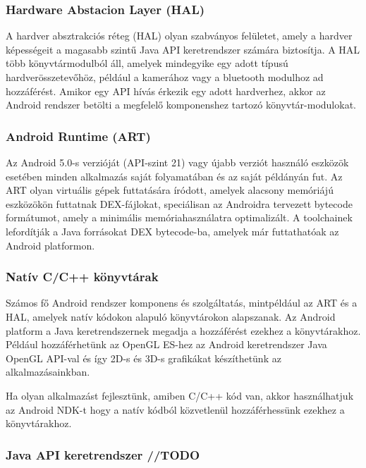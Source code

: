 \documentclass[../main.tex]{subfiles}
\begin{document}
        \subsubsection{Hardware Abstacion Layer (HAL)}
             A hardver absztrakciós réteg (HAL) olyan szabványos felületet, amely a hardver képességeit a magasabb szintű Java API keretrendszer számára biztosítja. A HAL több könyvtármodulból áll,  amelyek mindegyike egy adott típusú hardverösszetevőhöz, például a kamerához vagy a bluetooth modulhoz ad hozzáférést. Amikor egy API hívás érkezik egy adott hardverhez, akkor az Android rendszer betölti a megfelelő komponenshez tartozó könyvtár-modulokat.
            
        \subsubsection{Android Runtime (ART)}
            Az Android 5.0-s verzióját (API-szint 21) vagy újabb verziót használó eszközök esetében minden alkalmazás saját folyamatában és az saját példányán fut. Az ART olyan virtuális gépek futtatására íródott, amelyek alacsony memóriájú eszközökön futtatnak DEX-fájlokat, speciálisan az Androidra tervezett bytecode formátumot, amely a minimális memóriahasználatra optimalizált. A toolchainek lefordítják a Java forrásokat DEX bytecode-ba, amelyek már futtathatóak az Android platformon.
            
        \subsubsection{Natív C/C++ könyvtárak}
            Számos fő Android rendszer komponens és szolgáltatás, mintpéldául az ART és a HAL, amelyek natív kódokon alapuló könyvtárokon alapszanak. Az Android platform a Java keretrendszernek megadja a hozzáférést ezekhez a könyvtárakhoz. Például hozzáférhetünk az OpenGL ES-hez az Android keretrendszer Java OpenGL API-val és így 2D-s és 3D-s grafikákat készíthetünk az alkalmazásainkban.
            
            Ha olyan alkalmazást fejlesztünk, amiben C/C++ kód van, akkor használhatjuk az Android NDK-t hogy a natív kódból közvetlenül hozzáférhessünk ezekhez a könyvtárakhoz.
            
        \subsubsection{Java API keretrendszer //TODO}
            
\end{document}
